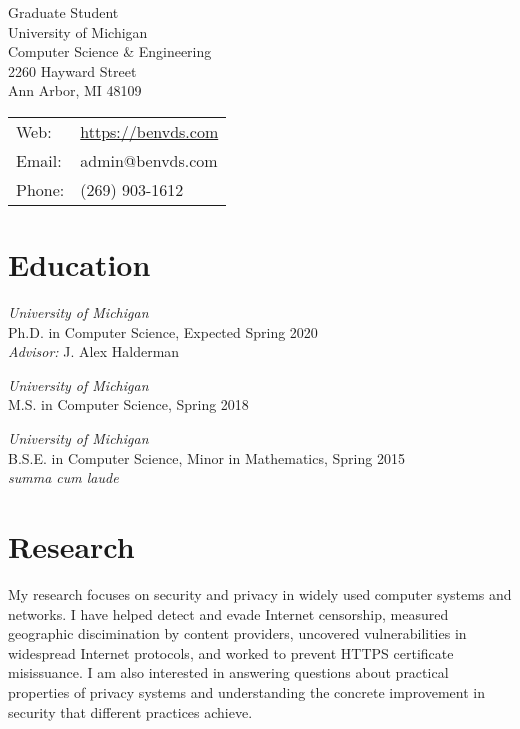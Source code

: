 \documentclass[margin,11pt]{res} %
\begin{document}
\begin{adjustwidth}{-1.3in}{0pt}
\vspace{20pt}

\noindent 
\parbox[m]{4in}{
Graduate Student \\
University of Michigan\\
Computer Science \& Engineering\\
2260 Hayward Street\\
Ann Arbor, MI  48109
}
\begin{tabular}{ll}
{Web}:& \url{https://benvds.com}\\
{Email}:& admin@benvds.com\\
{Phone}:& (269) 903-1612
\end{tabular}
\vspace{10pt}
\end{adjustwidth}

\section{\large Education}

        \emph{University of Michigan}\\
        Ph.D. in Computer Science, Expected Spring 2020\\
        \emph{Advisor:} J. Alex Halderman
		
        \emph{University of Michigan}\\
        M.S. in Computer Science, Spring 2018

        \emph{University of Michigan}\\
        B.S.E. in Computer Science, Minor in Mathematics, Spring 2015\\
		\emph{summa cum laude}


\vspace{6pt}
\section{\large Research}

My research focuses on security and privacy in widely used computer systems and networks. I have helped detect and evade Internet censorship, measured geographic discimination by content providers, uncovered vulnerabilities in widespread Internet protocols, and worked to prevent HTTPS certificate misissuance. I am also interested in answering questions about practical properties of privacy systems and understanding the concrete improvement in security that different practices achieve.
\end{document}
